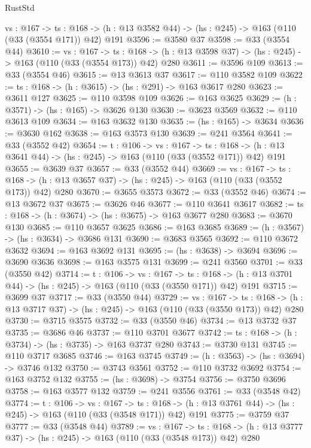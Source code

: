 \begin{lexlean}{RustStd}
\begin{coremodule}
  {vs : @167} ->
  {ts : @168} -> (h : @13 @3582 @44) -> (hs : @245) -> @163 (@110 (@33 (@3554 @171)) @42) @191
@3596 := @3580 @37
@3598 := @33 (@3554 @44)
@3610 := {vs : @167} ->
  {ts : @168} -> (h : @13 @3598 @37) -> (hs : @245) -> @163 (@110 (@33 (@3554 @173)) @42) @280
@3611 := @3596 @109
@3613 := @33 (@3554 @46)
@3615 := @13 @3613 @37
@3617 := @110 @3582 @109
@3622 := {ts : @168} -> (h : @3615) -> (hs : @291) -> @163 @3617 @280
@3623 := @3611 @127
@3625 := @110 @3598 @109
@3626 := @163 @3625
@3629 := (h : @3571) -> (hs : @165) -> @3626 @130
@3630 := @3623 @3569
@3632 := @110 @3613 @109
@3634 := @163 @3632 @130
@3635 := (hs : @165) -> @3634
@3636 := @3630 @162
@3638 := @163 @3573 @130
@3639 := @241 @3564
@3641 := @33 (@3552 @42)
@3654 := {t : @106} ->
  {vs : @167} ->
  {ts : @168} -> (h : @13 @3641 @44) -> (hs : @245) -> @163 (@110 (@33 (@3552 @171)) @42) @191
@3655 := @3639 @37
@3657 := @33 (@3552 @44)
@3669 := {vs : @167} ->
  {ts : @168} -> (h : @13 @3657 @37) -> (hs : @245) -> @163 (@110 (@33 (@3552 @173)) @42) @280
@3670 := @3655 @3573
@3672 := @33 (@3552 @46)
@3674 := @13 @3672 @37
@3675 := @3626 @46
@3677 := @110 @3641 @3617
@3682 := {ts : @168} -> (h : @3674) -> (hs : @3675) -> @163 @3677 @280
@3683 := @3670 @130
@3685 := @110 @3657 @3625
@3686 := @163 @3685
@3689 := (h : @3567) -> (hs : @3634) -> @3686 @131
@3690 := @3683 @3565
@3692 := @110 @3672 @3632
@3694 := @163 @3692 @131
@3695 := (hs : @3638) -> @3694
@3696 := @3690 @3636
@3698 := @163 @3575 @131
@3699 := @241 @3560
@3701 := @33 (@3550 @42)
@3714 := {t : @106} ->
  {vs : @167} ->
  {ts : @168} -> (h : @13 @3701 @44) -> (hs : @245) -> @163 (@110 (@33 (@3550 @171)) @42) @191
@3715 := @3699 @37
@3717 := @33 (@3550 @44)
@3729 := {vs : @167} ->
  {ts : @168} -> (h : @13 @3717 @37) -> (hs : @245) -> @163 (@110 (@33 (@3550 @173)) @42) @280
@3730 := @3715 @3575
@3732 := @33 (@3550 @46)
@3734 := @13 @3732 @37
@3735 := @3686 @46
@3737 := @110 @3701 @3677
@3742 := {ts : @168} -> (h : @3734) -> (hs : @3735) -> @163 @3737 @280
@3743 := @3730 @131
@3745 := @110 @3717 @3685
@3746 := @163 @3745
@3749 := (h : @3563) -> (hs : @3694) -> @3746 @132
@3750 := @3743 @3561
@3752 := @110 @3732 @3692
@3754 := @163 @3752 @132
@3755 := (hs : @3698) -> @3754
@3756 := @3750 @3696
@3758 := @163 @3577 @132
@3759 := @241 @3556
@3761 := @33 (@3548 @42)
@3774 := {t : @106} ->
  {vs : @167} ->
  {ts : @168} -> (h : @13 @3761 @44) -> (hs : @245) -> @163 (@110 (@33 (@3548 @171)) @42) @191
@3775 := @3759 @37
@3777 := @33 (@3548 @44)
@3789 := {vs : @167} ->
  {ts : @168} -> (h : @13 @3777 @37) -> (hs : @245) -> @163 (@110 (@33 (@3548 @173)) @42) @280

\end{coremodule}
\end{lexlean}
